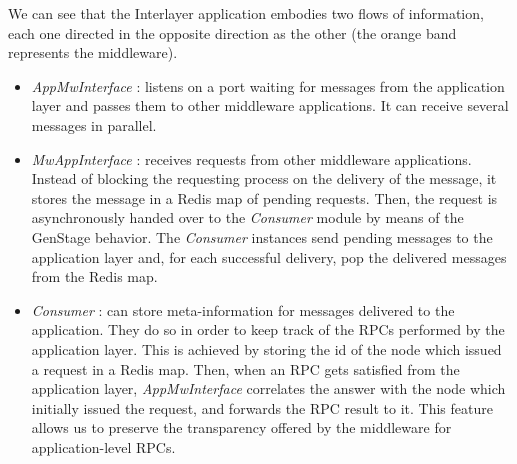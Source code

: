 We can see that the Interlayer application embodies two flows of information, each
one directed in the opposite direction as the other (the orange band represents
the middleware).
\begin{itemize}
\item \textit{AppMwInterface} : listens on a port waiting for messages
from the application layer and passes them to other middleware applications.
It can receive several messages in parallel.

\item \textit{MwAppInterface} : receives requests from other
middleware applications.
Instead of blocking the requesting process
on the delivery of the message, it stores the message
in a Redis map of pending requests. Then, the request is
asynchronously handed over to the \textit{Consumer} module by means of the
GenStage behavior. The \textit{Consumer} instances send
pending messages to the application layer and, for each successful delivery,
pop the delivered messages from the Redis map.

\item \textit{Consumer} : can store meta-information for messages delivered to
the application. They do so in order to keep track of the RPCs performed by the
application layer. This is achieved by storing the id of the node which issued a
request in a Redis map. Then, when an RPC gets satisfied from the
application layer, \textit{AppMwInterface} correlates the answer with the
node which initially issued the request, and forwards the RPC result to it.
This feature allows us to preserve the transparency offered by the
middleware for application-level RPCs.

\end{itemize}
